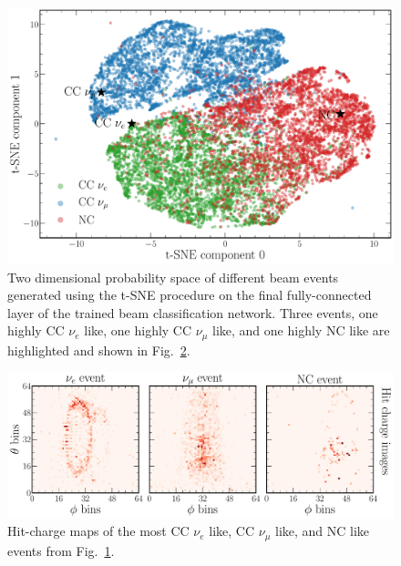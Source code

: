 \begin{figure} %
    \includegraphics[width=\textwidth]{diagrams/6-cvn/chipsnet/final_beam_tsne.pdf}
    \caption[Beam classification network t-SNE space.]
    {Two dimensional probability space of different beam events generated using the t-SNE
        procedure on the final fully-connected layer of the trained beam classification network.
        Three events, one highly CC $\nu_{e}$ like, one highly CC $\nu_{\mu}$ like, and one highly
        NC like are highlighted and shown in Fig.~\ref{fig:final_beam_tsne_events}.}
    \label{fig:final_beam_tsne}
\end{figure}

\begin{figure} %
    \includegraphics[width=\textwidth]{diagrams/6-cvn/chipsnet/final_beam_tsne_events.pdf}
    \caption[Hit-charge maps of highly CC $\nu_{e}$ like, CC $\nu_{\mu}$ like, and NC like events.]
    {Hit-charge maps of the most CC $\nu_{e}$ like, CC $\nu_{\mu}$ like, and NC like events from
        Fig.~\ref{fig:final_beam_tsne}.}
    \label{fig:final_beam_tsne_events}
\end{figure}
